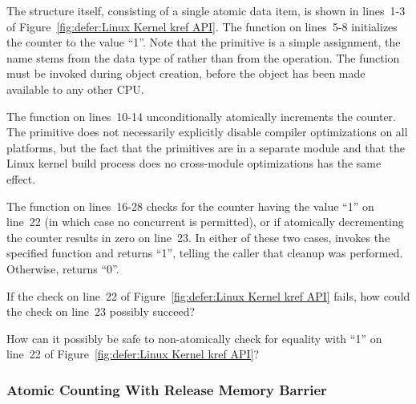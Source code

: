 The  structure itself, consisting of a single atomic
data item, is shown in lines~1-3 of
Figure~\ref{fig:defer:Linux Kernel kref API}.
The  function on lines~5-8 initializes the counter
to the value ``1''.
Note that the  primitive is a simple
assignment, the name stems from the data type of 
rather than from the operation.
The  function must be invoked during object creation,
before the object has been made available to any other CPU.

The  function on lines~10-14 unconditionally atomically
increments the counter.
The  primitive does not necessarily explicitly
disable compiler
optimizations on all platforms, but the fact that the 
primitives are in a separate module and that the Linux kernel build
process does no cross-module optimizations has the same effect.

The  function on lines~16-28 checks for the counter having the
value ``1'' on line~22
(in which case no concurrent  is permitted),
or if atomically decrementing the counter results in zero on line~23.
In either of these two cases,  invokes the
specified  function and returns ``1'', telling the
caller that cleanup was performed.
Otherwise,  returns ``0''.

\QuickQuiz{}
	If the check on line~22 of
	Figure~\ref{fig:defer:Linux Kernel kref API} fails, how
	could the check on line~23 possibly succeed?
 \QuickQuizEnd

\QuickQuiz{}
	How can it possibly be safe to non-atomically check for equality
	with ``1'' on line~22 of
	Figure~\ref{fig:defer:Linux Kernel kref API}?
 \QuickQuizEnd

\subsubsection{Atomic Counting With Release Memory Barrier}
\label{sec:defer:Atomic Counting With Release Memory Barrier}

